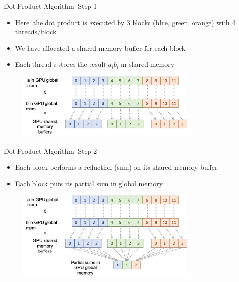 \documentclass{beamer}
\begin{document}
    \begin{frame}{Dot Product Algorithm: Step 1}
        \begin{itemize}
            \item Here, the dot product is executed by 3 blocks (blue, green, orange) with 4 threads/block
            \item We have allocated a shared memory buffer for each block
            \item Each thread $i$ stores the result $a_i b_i$ in shared memory
        \end{itemize}
        \begin{figure}
            \centering
            \includegraphics[width=0.8\textwidth]{img/04/dot-01.png}
        \end{figure}
    \end{frame}

    \begin{frame}{Dot Product Algorithm: Step 2}
        \begin{itemize}
            \item Each block performs a reduction (sum) on its shared memory buffer
            \item Each block puts its partial sum in global memory
        \end{itemize}
        \begin{figure}
            \centering
            \includegraphics[width=0.8\textwidth]{img/04/dot-02.png}
        \end{figure}
    \end{frame}
\end{document}
